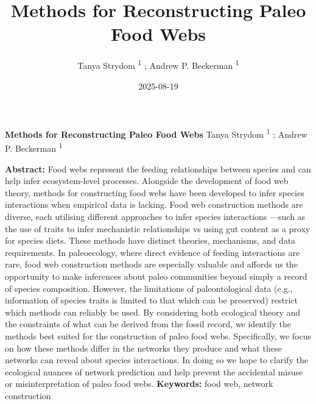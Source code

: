 \documentclass[
]{article}
\title{Methods for Reconstructing Paleo Food Webs}
\author{Tanya Strydom %
%
\textsuperscript{%
%
1%
}%
; Andrew P. Beckerman %
%
\textsuperscript{%
%
1%
}%
}
\date{2025-08-19}
\begin{document}
\thispagestyle{empty}
{\bfseries\sffamily\Large Methods for Reconstructing Paleo Food Webs}
\vfil
Tanya Strydom %
%
\textsuperscript{%
%
1%
}%
; Andrew P. Beckerman %
%
\textsuperscript{%
%
1%
}%

\vfil
{\small
\textbf{Abstract:} Food webs represent the feeding relationships between
species and can help infer ecosystem-level processes. Alongside the
development of food web theory, methods for constructing food webs have
been developed to infer species interactions when empirical data is
lacking. Food web construction methods are diverse, each utilising
different approaches to infer species interactions ---such as the use of
traits to infer mechanistic relationships vs using gut content as a
proxy for species diets. These methods have distinct theories,
mechanisms, and data requirements. In paleoecology, where direct
evidence of feeding interactions are rare, food web construction methods
are especially valuable and affords us the opportunity to make
inferences about paleo communities beyond simply a record of species
composition. However, the limitations of paleontological data (e.g.,
information of species traits is limited to that which can be preserved)
restrict which methods can reliably be used. By considering both
ecological theory and the constraints of what can be derived from the
fossil record, we identify the methods best suited for the construction
of paleo food webs. Specifically, we focus on how these methods differ
in the networks they produce and what these networks can reveal about
species interactions. In doing so we hope to clarify the ecological
nuances of network prediction and help prevent the accidental misuse or
misinterpretation of paleo food webs.
\vfil
\textbf{Keywords:} %
food web, %
network construction%
}
\clearpage
\setcounter{page}{1}
\doublespacing
\linenumbers
\end{document}
